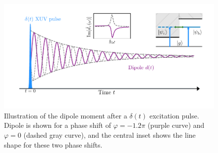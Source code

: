 \begin{figure}
	\centering
	\includegraphics[width=1.0\textwidth]{figures/ATS/dipole_sketch.pdf}
	\caption[Illustration of dipole moment in the time-domain with various phase shifts]{Illustration of the dipole moment after a $\delta(t)$ excitation pulse. Dipole is shown for a phase shift of $\varphi=-1.2\pi$ (purple curve) and $\varphi=0$ (dashed gray curve), and the central inset shows the line shape for these two phase shifts.}
	\label{fig:dipole_sketch}
\end{figure}

